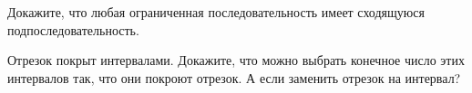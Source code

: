 \documentclass[a4paper,11pt]{article}
\begin{document}
 Докажите, что любая ограниченная последовательность имеет сходящуюся подпоследовательность.







Отрезок покрыт интервалами. Докажите, что
можно выбрать конечное число этих интервалов так,
что они покроют отрезок.
А если заменить отрезок на интервал?


%










\end{document}
